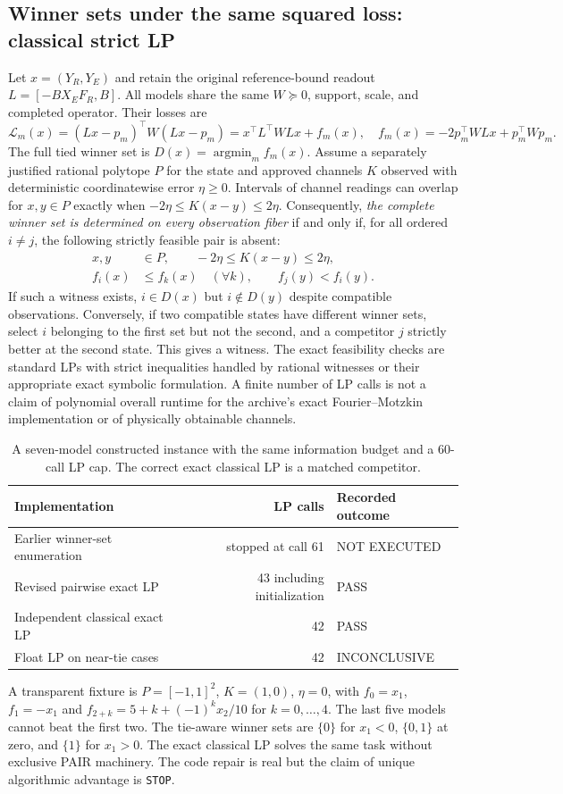 \subsection{Winner sets under the same squared loss: classical strict LP}
Let $x=(Y_R,Y_E)$ and retain the original reference-bound readout $L=[-BX_EF_R,B]$. All models share the same $W\succeq0$, support, scale, and completed operator. Their losses are
\[
\mathcal L_m(x)=(Lx-p_m)^\top W(Lx-p_m)=x^\top L^\top WLx+f_m(x),
\quad f_m(x)=-2p_m^\top WLx+p_m^\top Wp_m.
\]
The full tied winner set is $D(x)=\operatorname*{argmin}_m f_m(x)$. Assume a separately justified rational polytope $P$ for the state and approved channels $K$ observed with deterministic coordinatewise error $\eta\ge0$. Intervals of channel readings can overlap for $x,y\in P$ exactly when $-2\eta\le K(x-y)\le2\eta$. Consequently, \emph{the complete winner set is determined on every observation fiber} if and only if, for all ordered $i\ne j$, the following strictly feasible pair is absent:
\begin{align*}
x,y&\in P,\qquad -2\eta\le K(x-y)\le2\eta,\\
f_i(x)&\le f_k(x)\quad(\forall k),\qquad f_j(y)<f_i(y).
\end{align*}
If such a witness exists, $i\in D(x)$ but $i\notin D(y)$ despite compatible observations. Conversely, if two compatible states have different winner sets, select $i$ belonging to the first set but not the second, and a competitor $j$ strictly better at the second state. This gives a witness. The exact feasibility checks are standard LPs with strict inequalities handled by rational witnesses or their appropriate exact symbolic formulation. A finite number of LP calls is not a claim of polynomial overall runtime for the archive's exact Fourier--Motzkin implementation or of physically obtainable channels.

\begin{table}[htbp]
\centering\small
\caption{A seven-model constructed instance with the same information budget and a 60-call LP cap. The correct exact classical LP is a matched competitor.}
\label{tab:lp-benchmark}
\begin{tabularx}{\textwidth}{@{}XrX@{}}
\toprule Implementation & LP calls & Recorded outcome\\\midrule
Earlier winner-set enumeration & stopped at call 61 & NOT EXECUTED\\
Revised pairwise exact LP & 43 including initialization & PASS\\
Independent classical exact LP & 42 & PASS\\
Float LP on near-tie cases & 42 & INCONCLUSIVE\\\bottomrule
\end{tabularx}
\end{table}
A transparent fixture is $P=[-1,1]^2$, $K=(1,0)$, $\eta=0$, with $f_0=x_1$, $f_1=-x_1$ and $f_{2+k}=5+k+(-1)^kx_2/10$ for $k=0,\ldots,4$. The last five models cannot beat the first two. The tie-aware winner sets are $\{0\}$ for $x_1<0$, $\{0,1\}$ at zero, and $\{1\}$ for $x_1>0$. The exact classical LP solves the same task without exclusive PAIR machinery. The code repair is real but the claim of unique algorithmic advantage is \texttt{STOP}.

